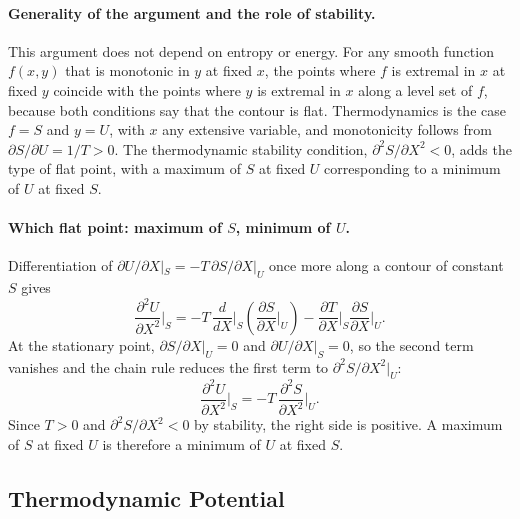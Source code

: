 \paragraph{Generality of the argument and the role of stability.}
This argument does not depend on entropy or energy. For any smooth function
$f(x,y)$ that is monotonic in $y$ at fixed $x$, the points where $f$ is
extremal in $x$ at fixed $y$ coincide with the points where $y$ is extremal
in $x$ along a level set of $f$, because both conditions say that the
contour is flat. Thermodynamics is the case $f=S$ and $y=U$, with $x$ any
extensive variable, and monotonicity follows from $\partial S/\partial
U=1/T>0$. The thermodynamic stability condition, $\partial^2S/\partial
X^2<0$, adds the type of flat point, with a maximum of $S$ at fixed $U$
corresponding to a minimum of $U$ at fixed $S$.

\paragraph{Which flat point: maximum of $S$, minimum of $U$.}
Differentiation of $\partial U/\partial X|_S=-T\,\partial S/\partial X|_U$
once more along a contour of constant $S$ gives
\begin{equation*}
    \frac{\partial^2U}{\partial X^2}\bigg|_S
    =-T\,\frac{d}{dX}\bigg|_S\left(\frac{\partial S}{\partial X}\bigg|_U\right)
    -\frac{\partial T}{\partial X}\bigg|_S\frac{\partial S}{\partial X}\bigg|_U.
\end{equation*}
At the stationary point, $\partial S/\partial X|_U=0$ and
$\partial U/\partial X|_S=0$, so the second term vanishes and the chain rule
reduces the first term to $\partial^2S/\partial X^2|_U$:
\begin{equation}
    \boxed{\frac{\partial^2U}{\partial X^2}\bigg|_S
    =-T\,\frac{\partial^2S}{\partial X^2}\bigg|_U.}
\end{equation}
Since $T>0$ and $\partial^2S/\partial X^2<0$ by stability, the right side is
positive. A maximum of $S$ at fixed $U$ is therefore a minimum of $U$ at
fixed $S$.

\subsection{Thermodynamic Potential}

